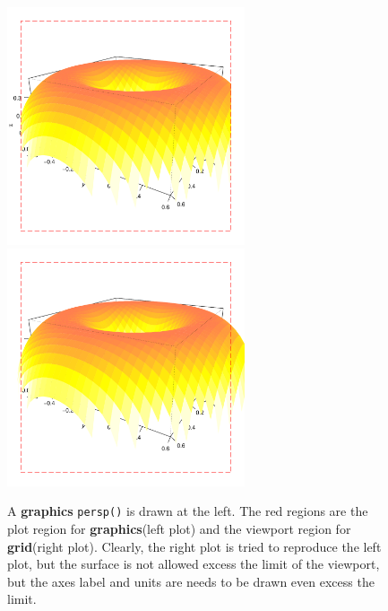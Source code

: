 \documentclass{report}
\begin{document}
\begin{figure}[h]
	\begin{center}
		\includegraphics[height = 7cm, width = 7cm]{figure/gridGraphics_persp_demo_viewport3_1.pdf}
		\includegraphics[height = 7cm, width = 7cm]{figure/gridGraphics_persp_demo_viewport3_2.pdf}
		\caption{A \textbf{graphics} \texttt{persp()} is drawn at the left. The red regions are the plot region for \textbf{graphics}(left plot) and the viewport region for \textbf{grid}(right plot). Clearly, the right plot is tried to reproduce the left plot, but the surface is not allowed excess the limit of the viewport, but the axes label and units are needs to be drawn even excess the limit.}
		\label{figure_4.5}
	\end{center}
\end{figure}
\end{document}

